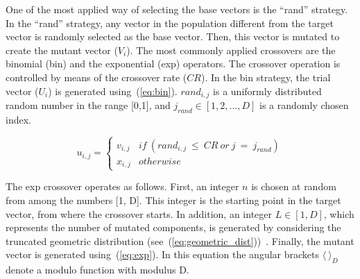 \documentclass[review,3p]{elsarticle}
\newcommand{\EAS}{{\sc ea}s}
\newcommand{\DE}{{\sc de}}
\newcommand{\NP}{{\sc np}}
\begin{document}
One of the most applied way of selecting the base vectors is the ``rand'' strategy.
%
In the ``rand'' strategy, any vector in the population different from the target vector is randomly selected as the base vector.
%
Then, this vector is mutated to create the mutant vector ($V_i$).
%
%
%
%
%
%
%
%
The most commonly applied crossovers are the binomial (bin) and the exponential (exp) operators.
%
The crossover operation is controlled by means of the crossover rate ($CR$).
%
In the bin strategy, the trial vector ($U_i$) is generated using~(\ref{eq:bin}).
%
$rand_{i,j}$ is a uniformly distributed random number in the range [0,1], and
$j_{rand} \in [1, 2, ..., D]$ is a randomly chosen index.
%
%
%

\begin{equation}
	\label{eq:bin}
 u_{i,j} = \left \{
 \begin{array}{ll}
 		v_{i,j} & if\ (rand_{i,j}\ \leq\ CR\ or\ j\ =\ j_{rand}) \\
		x_{i,j} & otherwise
 \end{array} \right.
\end{equation}

The exp crossover operates as follows.
%
First, an integer $n$ is chosen at random from among the numbers [1, D].
%
This integer is the starting point in the target vector, from where the crossover starts.
%
In addition, an integer $L \in [1, D]$, which represents the number of mutated components, is
generated by considering the truncated geometric distribution (see~(\ref{eq:geometric_dist}))~\cite{Zaharie:09}.
%
Finally, the mutant vector is generated using~(\ref{eq:exp}).
%
In this equation the angular brackets $\langle\ \rangle _D$ denote a modulo function with modulus D.
\end{document}
